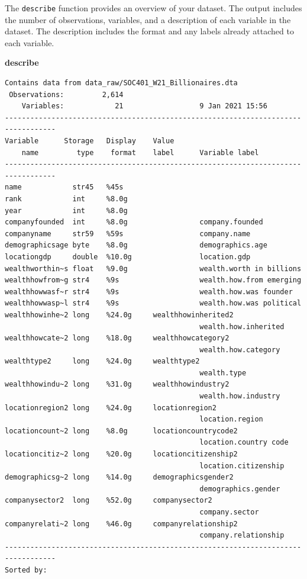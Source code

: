 \documentclass[
]{book}
\newenvironment{Shaded}{\begin{snugshade}}{\end{snugshade}}
\newcommand{\KeywordTok}[1]{\textcolor[rgb]{0.13,0.29,0.53}{\textbf{#1}}}
\begin{document}
The \texttt{describe} function provides an overview of your dataset. The output includes the number of observations, variables, and a description of each variable in the dataset. The description includes the format and any labels already attached to each variable.

\begin{Shaded}
\begin{Highlighting}[]
\KeywordTok{describe}
\end{Highlighting}
\end{Shaded}

\begin{verbatim}
Contains data from data_raw/SOC401_W21_Billionaires.dta
 Observations:         2,614                  
    Variables:            21                  9 Jan 2021 15:56
----------------------------------------------------------------------------------
Variable      Storage   Display    Value
    name         type    format    label      Variable label
----------------------------------------------------------------------------------
name            str45   %45s                  
rank            int     %8.0g                 
year            int     %8.0g                 
companyfounded  int     %8.0g                 company.founded
companyname     str59   %59s                  company.name
demographicsage byte    %8.0g                 demographics.age
locationgdp     double  %10.0g                location.gdp
wealthworthin~s float   %9.0g                 wealth.worth in billions
wealthhowfrom~g str4    %9s                   wealth.how.from emerging
wealthhowwasf~r str4    %9s                   wealth.how.was founder
wealthhowwasp~l str4    %9s                   wealth.how.was political
wealthhowinhe~2 long    %24.0g     wealthhowinherited2
                                              wealth.how.inherited
wealthhowcate~2 long    %18.0g     wealthhowcategory2
                                              wealth.how.category
wealthtype2     long    %24.0g     wealthtype2
                                              wealth.type
wealthhowindu~2 long    %31.0g     wealthhowindustry2
                                              wealth.how.industry
locationregion2 long    %24.0g     locationregion2
                                              location.region
locationcount~2 long    %8.0g      locationcountrycode2
                                              location.country code
locationcitiz~2 long    %20.0g     locationcitizenship2
                                              location.citizenship
demographicsg~2 long    %14.0g     demographicsgender2
                                              demographics.gender
companysector2  long    %52.0g     companysector2
                                              company.sector
companyrelati~2 long    %46.0g     companyrelationship2
                                              company.relationship
----------------------------------------------------------------------------------
Sorted by: 
\end{verbatim}
\end{document}

